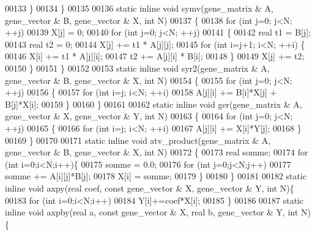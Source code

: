 \begin{DoxyCode}
00133     \}
00134   \}
00135 
00136   \textcolor{keyword}{static} \textcolor{keyword}{inline} \textcolor{keywordtype}{void} symv(gene\_matrix & A, gene\_vector & B, gene\_vector & X, \textcolor{keywordtype}{int} N)
00137   \{
00138     \textcolor{keywordflow}{for} (\textcolor{keywordtype}{int} j=0; j<N; ++j)
00139       X[j] = 0;
00140     \textcolor{keywordflow}{for} (\textcolor{keywordtype}{int} j=0; j<N; ++j)
00141     \{
00142       real t1 = B[j];
00143       real t2 = 0;
00144       X[j] += t1 * A[j][j];
00145       \textcolor{keywordflow}{for} (\textcolor{keywordtype}{int} i=j+1; i<N; ++i) \{
00146         X[i] += t1 * A[j][i];
00147         t2 += A[j][i] * B[i];
00148       \}
00149       X[j] += t2;
00150     \}
00151   \}
00152   
00153   \textcolor{keyword}{static} \textcolor{keyword}{inline} \textcolor{keywordtype}{void} syr2(gene\_matrix & A, gene\_vector & B, gene\_vector & X, \textcolor{keywordtype}{int} N)
00154   \{
00155     \textcolor{keywordflow}{for} (\textcolor{keywordtype}{int} j=0; j<N; ++j)
00156     \{
00157       \textcolor{keywordflow}{for} (\textcolor{keywordtype}{int} i=j; i<N; ++i)
00158         A[j][i] += B[i]*X[j] + B[j]*X[i];
00159     \}
00160   \}
00161 
00162   \textcolor{keyword}{static} \textcolor{keyword}{inline} \textcolor{keywordtype}{void} ger(gene\_matrix & A, gene\_vector & X, gene\_vector & Y, \textcolor{keywordtype}{int} N)
00163   \{
00164     \textcolor{keywordflow}{for} (\textcolor{keywordtype}{int} j=0; j<N; ++j)
00165     \{
00166       \textcolor{keywordflow}{for} (\textcolor{keywordtype}{int} i=j; i<N; ++i)
00167         A[j][i] += X[i]*Y[j];
00168     \}
00169   \}
00170 
00171   \textcolor{keyword}{static} \textcolor{keyword}{inline} \textcolor{keywordtype}{void} atv\_product(gene\_matrix & A, gene\_vector & B, gene\_vector & X, \textcolor{keywordtype}{int} N)
00172   \{
00173     real somme;
00174     \textcolor{keywordflow}{for} (\textcolor{keywordtype}{int} i=0;i<N;i++)\{
00175       somme = 0.0;
00176       \textcolor{keywordflow}{for} (\textcolor{keywordtype}{int} j=0;j<N;j++)
00177         somme += A[i][j]*B[j];
00178       X[i] = somme;
00179     \}
00180   \}
00181 
00182   \textcolor{keyword}{static} \textcolor{keyword}{inline} \textcolor{keywordtype}{void} axpy(real coef, \textcolor{keyword}{const} gene\_vector & X, gene\_vector & Y, \textcolor{keywordtype}{int} N)\{
00183     \textcolor{keywordflow}{for} (\textcolor{keywordtype}{int} i=0;i<N;i++)
00184       Y[i]+=coef*X[i];
00185   \}
00186 
00187   \textcolor{keyword}{static} \textcolor{keyword}{inline} \textcolor{keywordtype}{void} axpby(real a, \textcolor{keyword}{const} gene\_vector & X, real b, gene\_vector & Y, \textcolor{keywordtype}{int} N)\{

\end{DoxyCode}
